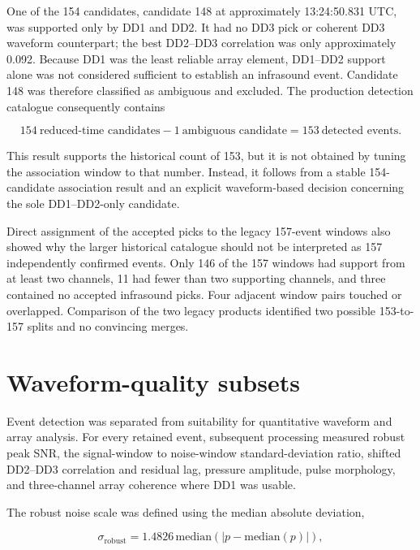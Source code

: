 \documentclass[11pt]{article}
\begin{document}
One of the 154 candidates, candidate 148 at approximately 13:24:50.831 UTC,
was supported only by DD1 and DD2. It had no DD3 pick or coherent DD3 waveform
counterpart; the best DD2--DD3 correlation was only approximately 0.092.
Because DD1 was the least reliable array element, DD1--DD2 support alone was
not considered sufficient to establish an infrasound event. Candidate 148 was
therefore classified as ambiguous and excluded. The production detection
catalogue consequently contains

\begin{equation}
154\ \text{reduced-time candidates}
-1\ \text{ambiguous candidate}
=153\ \text{detected events}.
\end{equation}

This result supports the historical count of 153, but it is not obtained by
tuning the association window to that number. Instead, it follows from a
stable 154-candidate association result and an explicit waveform-based
decision concerning the sole DD1--DD2-only candidate.

Direct assignment of the accepted picks to the legacy 157-event windows also
showed why the larger historical catalogue should not be interpreted as 157
independently confirmed events. Only 146 of the 157 windows had support from
at least two channels, 11 had fewer than two supporting channels, and three
contained no accepted infrasound picks. Four adjacent window pairs touched or
overlapped. Comparison of the two legacy products identified two possible
153-to-157 splits and no convincing merges.

\section{Waveform-quality subsets}

Event detection was separated from suitability for quantitative waveform and
array analysis. For every retained event, subsequent processing measured
robust peak SNR, the signal-window to noise-window standard-deviation ratio,
shifted DD2--DD3 correlation and residual lag, pressure amplitude, pulse
morphology, and three-channel array coherence where DD1 was usable.

The robust noise scale was defined using the median absolute deviation,

\begin{equation}
\sigma_{\mathrm{robust}}
=
1.4826\,\mathrm{median}
\left(
\left|p-\mathrm{median}(p)\right|
\right),
\end{equation}
\end{document}
